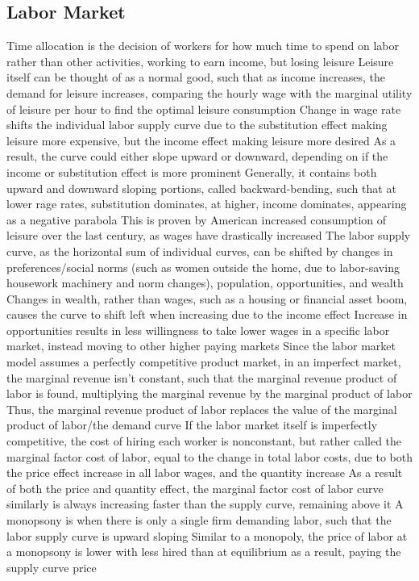 \documentclass[11 pt, twoside]{article}
\newenvironment{outline*}
{
	\begin{outline}[enumerate]
	}
	{\end{outline}
}
\begin{document}
\subsection{Labor Market}
\begin{outline*}
\1 Time allocation is the decision of workers for how much time to spend on labor rather than other activities, working to earn income, but losing leisure
\2 Leisure itself can be thought of as a normal good, such that as income increases, the demand for leisure increases, comparing the hourly wage with the marginal utility of leisure per hour to find the optimal leisure consumption
\2 Change in wage rate shifts the individual labor supply curve due to the substitution effect making leisure more expensive, but the income effect making leisure more desired
\3 As a result, the curve could either slope upward or downward, depending on if the income or substitution effect is more prominent
\3 Generally, it contains both upward and downward sloping portions, called backward-bending, such that at lower rage rates, substitution dominates, at higher, income dominates, appearing as a negative parabola
\3 This is proven by American increased consumption of leisure over the last century, as wages have drastically increased
\1 The labor supply curve, as the horizontal sum of individual curves, can be shifted by changes in preferences/social norms (such as women outside the home, due to labor-saving housework machinery and norm changes), population, opportunities, and wealth
\2 Changes in wealth, rather than wages, such as a housing or financial asset boom, causes the curve to shift left when increasing due to the income effect
\2 Increase in opportunities results in less willingness to take lower wages in a specific labor market, instead moving to other higher paying markets
\1 Since the labor market model assumes a perfectly competitive product market, in an imperfect market, the marginal revenue isn't constant, such that the marginal revenue product of labor is found, multiplying the marginal revenue by the marginal product of labor
\2 Thus, the marginal revenue product of labor replaces the value of the marginal product of labor/the demand curve
\1 If the labor market itself is imperfectly competitive, the cost of hiring each worker is nonconstant, but rather called the marginal factor cost of labor, equal to the change in total labor costs, due to both the price effect increase in all labor wages, and the quantity increase
\2 As a result of both the price and quantity effect, the marginal factor cost of labor curve similarly is always increasing faster than the supply curve, remaining above it
\2 A monopsony is when there is only a single firm demanding labor, such that the labor supply curve is upward sloping
\2 Similar to a monopoly, the price of labor at a monopsony is lower with less hired than at equilibrium as a result, paying the supply curve price
\end{outline*}
\end{document}
